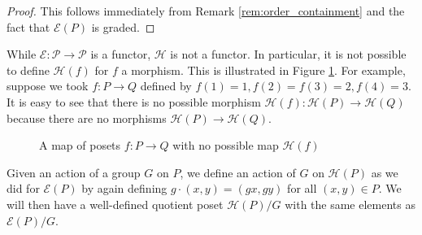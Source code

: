 \documentclass[smallextended]{svjour3}       %
\numberwithin{equation}{section}
\begin{document}
\begin{proof}
This follows immediately from Remark \ref{rem:order_containment} and the fact that $\mathcal E(P)$ is graded.
\end{proof}

\begin{remark}
While $\mathcal E\colon\mathcal P \rightarrow \mathcal P$ is a functor, $\mathcal H$ is not a functor. In particular, it is not possible to define $\mathcal H(f)$ for $f$ a morphism. This is illustrated in Figure \ref{fig:h_morphism}. For example, suppose we took $f\colon P \rightarrow Q$ defined by $f(1) = 1, f(2) = f(3) = 2,f(4) = 3$. 
It is easy to see that there is no possible morphism $\mathcal H(f)\colon\mathcal H(P)\rightarrow \mathcal H(Q)$ because there are no morphisms $\mathcal H(P) \rightarrow \mathcal H(Q)$.

\begin{figure}[h!]
\begin{center}
\quad
{}\quad
{} \quad
{}
\end{center}
\caption{\label{fig:h_morphism} A map of posets $f:P \rightarrow Q$ with no possible map $\mathcal H(f)$}
\end{figure}
\end{remark}



Given an action of a group $G$ on $P$, we define an action of $G$ on $\mathcal{H}(P)$ as we did for $\mathcal{E}(P)$ by again defining $g\cdot (x,y) = (gx,gy)$ for all $(x,y)\in P$.  We will then have a well-defined quotient poset $\mathcal{H}(P)/G$ with the same elements as $\mathcal{E}(P)/G$.
\end{document}
